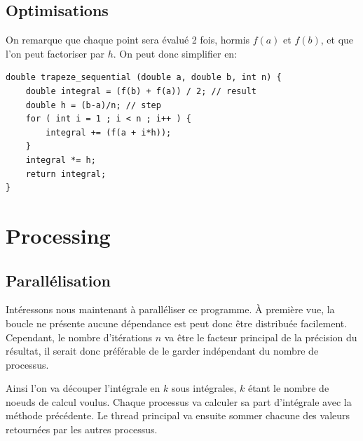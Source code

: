\documentclass{article}
\begin{document}
\subsection{Optimisations}

On remarque que chaque point sera évalué 2 fois, hormis $f(a)$ et $f(b)$, et que l'on peut factoriser par $h$.
On peut donc simplifier en:

\begin{lstlisting}[style=ccode, morekeywords={f}]
double trapeze_sequential (double a, double b, int n) {
    double integral = (f(b) + f(a)) / 2; // result
    double h = (b-a)/n; // step
    for ( int i = 1 ; i < n ; i++ ) {
        integral += (f(a + i*h));
    }
    integral *= h;
    return integral;
}
\end{lstlisting}

\newpage
\section{Processing}
\subsection{Parallélisation}

Intéressons nous maintenant à paralléliser ce programme.
À première vue, la boucle ne présente aucune dépendance est peut donc être distribuée facilement.
Cependant, le nombre d'itérations $n$ va être le facteur principal de la précision du résultat, il serait donc préférable de le garder indépendant du nombre de processus.

Ainsi l'on va découper l'intégrale en $k$ sous intégrales, $k$ étant le nombre de noeuds de calcul voulus. Chaque processus va calculer sa part d'intégrale avec la méthode précédente. Le thread principal va ensuite sommer chacune des valeurs retournées par les autres processus.
\end{document}
